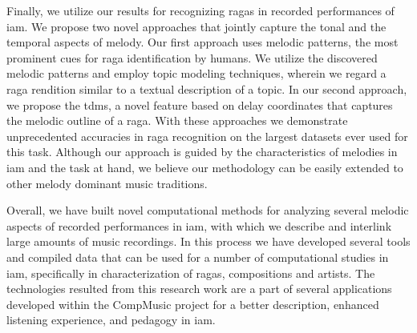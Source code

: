 Finally, we utilize our results for recognizing \glspl{raga} in recorded performances of \gls{iam}. We propose two novel approaches that jointly capture the tonal and the temporal aspects of melody. Our first approach uses melodic patterns, the most prominent cues for \gls{raga} identification by humans. We utilize the discovered melodic patterns and employ topic modeling techniques, wherein we regard a \gls{raga} rendition similar to a textual description of a topic. In our second approach, we propose the \acrlong{tdms}, a novel feature based on delay coordinates that captures the melodic outline of a \gls{raga}. With these approaches we demonstrate unprecedented accuracies in \gls{raga} recognition on the largest datasets ever used for this task.  Although our approach is guided by the characteristics of melodies in \gls{iam} and the task at hand, we believe our methodology can be easily extended to other melody dominant music traditions.

Overall, we have built novel computational methods for analyzing several melodic aspects of recorded performances in \gls{iam}, with which we describe and interlink large amounts of music recordings. In this process we have developed several tools and compiled data that can be used for a number of computational studies in \gls{iam}, specifically in characterization of \glspl{raga}, compositions and artists. The technologies resulted from this research work are a part of several applications developed within the CompMusic project for a better description, enhanced listening experience, and pedagogy in \gls{iam}.


